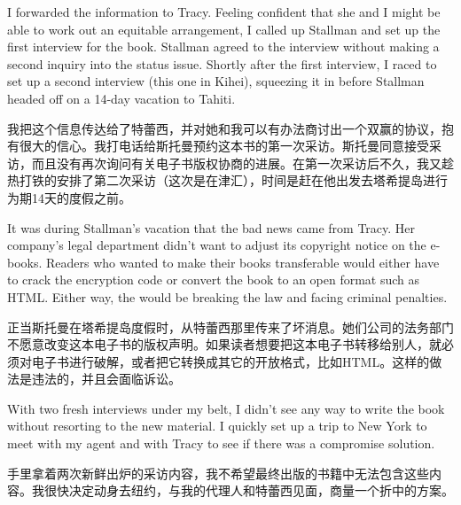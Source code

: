 \ifdefined\eng
I forwarded the information to Tracy. Feeling confident that she and I might be able to work out an equitable arrangement, I called up Stallman and set up the first interview for the book. Stallman agreed to the interview without making a second inquiry into the status issue. Shortly after the first interview, I raced to set up a second interview (this one in Kihei), squeezing it in before Stallman headed off on a 14-day vacation to Tahiti. %
\fi

\ifdefined\chs
我把这个信息传达给了特蕾西，并对她和我可以有办法商讨出一个双赢的协议，抱有很大的信心。我打电话给斯托曼预约这本书的第一次采访。斯托曼同意接受采访，而且没有再次询问有关电子书版权协商的进展。在第一次采访后不久，我又趁热打铁的安排了第二次采访（这次是在津汇），时间是赶在他出发去塔希提岛进行为期14天的度假之前。%
\fi

\ifdefined\eng
It was during Stallman's vacation that the bad news came from Tracy. Her company's legal department didn't want to adjust its copyright notice on the e-books. Readers who wanted to make their books transferable would either have to crack the encryption code or convert the book to an open format such as HTML. Either way, the would be breaking the law and facing criminal penalties.
\fi

\ifdefined\chs
正当斯托曼在塔希提岛度假时，从特蕾西那里传来了坏消息。她们公司的法务部门不愿意改变这本电子书的版权声明。如果读者想要把这本电子书转移给别人，就必须对电子书进行破解，或者把它转换成其它的开放格式，比如HTML。这样的做法是违法的，并且会面临诉讼。
\fi

\ifdefined\eng
With two fresh interviews under my belt, I didn't see any way to write the book without resorting to the new material. I quickly set up a trip to New York to meet with my agent and with Tracy to see if there was a compromise solution.
\fi

\ifdefined\chs
手里拿着两次新鲜出炉的采访内容，我不希望最终出版的书籍中无法包含这些内容。我很快决定动身去纽约，与我的代理人和特蕾西见面，商量一个折中的方案。
\fi

